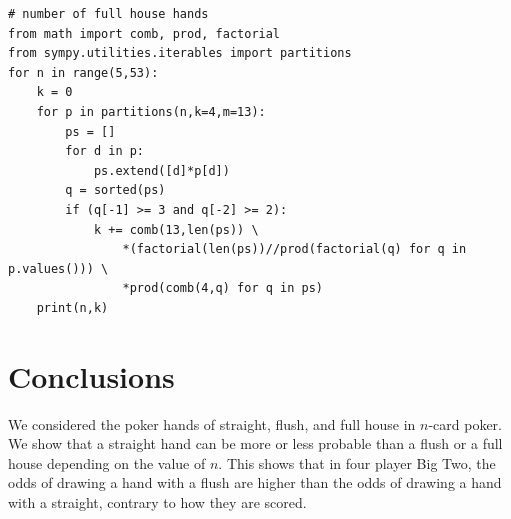 \documentclass{article}
\begin{document}
\begin{lstlisting}[label={lst:full},frame=single,caption=Python code to compute the number of full house hands.]
# number of full house hands
from math import comb, prod, factorial
from sympy.utilities.iterables import partitions
for n in range(5,53):
    k = 0
    for p in partitions(n,k=4,m=13):
        ps = []
        for d in p:
            ps.extend([d]*p[d])
        q = sorted(ps)
        if (q[-1] >= 3 and q[-2] >= 2):
            k += comb(13,len(ps)) \
                *(factorial(len(ps))//prod(factorial(q) for q in p.values())) \
                *prod(comb(4,q) for q in ps)
    print(n,k)
\end{lstlisting}

\section{Conclusions}
We considered the poker hands of straight, flush, and full house in $n$-card poker. 
We show that a straight hand can be more or less probable than a flush or a full house depending on the value of $n$. This shows that in four player Big Two, the odds of drawing a hand with a flush are higher than the odds of drawing a hand with a straight, contrary to how they are scored.



\end{document}
